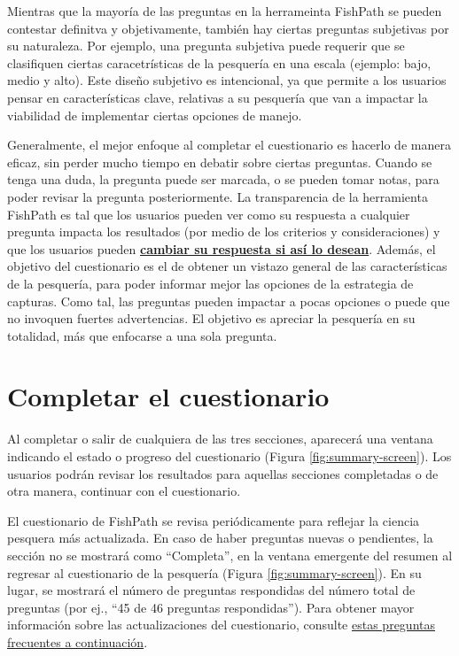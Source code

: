 \documentclass[
  11pt,
]{book}
\begin{document}
Mientras que la mayoría de las preguntas en la herrameinta FishPath se pueden contestar definitva y objetivamente, también hay ciertas preguntas subjetivas por su naturaleza. Por ejemplo, una pregunta subjetiva puede requerir que se clasifiquen ciertas caracetrísticas de la pesquería en una escala (ejemplo: bajo, medio y alto). Este diseño subjetivo es intencional, ya que permite a los usuarios pensar en características clave, relativas a su pesquería que van a impactar la viabilidad de implementar ciertas opciones de manejo.

Generalmente, el mejor enfoque al completar el cuestionario es hacerlo de manera eficaz, sin perder mucho tiempo en debatir sobre ciertas preguntas. Cuando se tenga una duda, la pregunta puede ser marcada, o se pueden tomar notas, para poder revisar la pregunta posteriormente. La transparencia de la herramienta FishPath es tal que los usuarios pueden ver como su respuesta a cualquier pregunta impacta los resultados (por medio de los criterios y consideraciones) y que los usuarios pueden \protect\hyperlink{Bookmark-Influential}{\textbf{cambiar su respuesta si así lo desean}}. Además, el objetivo del cuestionario es el de obtener un vistazo general de las características de la pesquería, para poder informar mejor las opciones de la estrategia de capturas. Como tal, las preguntas pueden impactar a pocas opciones o puede que no invoquen fuertes advertencias. El objetivo es apreciar la pesquería en su totalidad, más que enfocarse a una sola pregunta.

\hypertarget{completar-el-cuestionario}{%
\section{Completar el cuestionario}\label{completar-el-cuestionario}}

Al completar o salir de cualquiera de las tres secciones, aparecerá una ventana indicando el estado o progreso del cuestionario (Figura \ref{fig:summary-screen}). Los usuarios podrán revisar los resultados para aquellas secciones completadas o de otra manera, continuar con el cuestionario.

El cuestionario de FishPath se revisa periódicamente para reflejar la ciencia pesquera más actualizada. En caso de haber preguntas nuevas o pendientes, la sección no se mostrará como ``Completa'', en la ventana emergente del resumen al regresar al cuestionario de la pesquería (Figura \ref{fig:summary-screen}). En su lugar, se mostrará el número de preguntas respondidas del número total de preguntas (por ej., ``45 de 46 preguntas respondidas''). Para obtener mayor información sobre las actualizaciones del cuestionario, consulte \protect\hyperlink{faq-content-updates}{estas preguntas frecuentes a continuación}.
\end{document}
